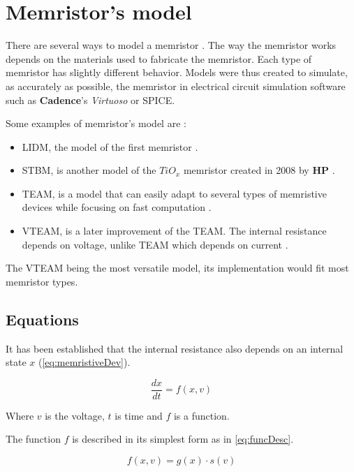 \section{Memristor's model}\label{sec:model}

There are several ways to model a memristor \cite{memristorFab,memTEAMmodel, memVTEAMmodel, memristorSpiceModels}. The way the memristor works depends on the materials used to fabricate the memristor. Each type of memristor has slightly different behavior. Models were thus created to simulate, as accurately as possible, the memristor in electrical circuit simulation software such as \textbf{Cadence}'s \textit{Virtuoso} or SPICE.

Some examples of memristor's model are :

\begin{itemize}
  \item \acf{LIDM}, the model of the first memristor \cite{memristorFab}.
  \item \acf{STBM}, is another model of the $TiO_x$ memristor created in 2008 by \textbf{HP} \cite{memristorFab, memristorSpiceModels}.
  \item \acf{TEAM}, is a model that can easily adapt to several types of memristive devices while focusing on fast computation \cite{memTEAMmodel}.
  \item \acf{VTEAM}, is a later improvement of the \ac{TEAM}. The internal resistance depends on voltage, unlike \ac{TEAM} which depends on current \cite{memVTEAMmodel}.
\end{itemize}

The \ac{VTEAM} being the most versatile model, its implementation would fit most memristor types.

\subsection{Equations}

It has been established that the internal resistance also depends on an internal state $x$ (\cref{eq:memristiveDev}).

\begin{equation}
  \frac{dx}{dt}=f(x,v)
\end{equation}

Where $v$ is the voltage, $t$ is time and $f$ is a function.

The function $f$ is described in its simplest form as in \cref{eq:funcDesc}.

\begin{equation}\label{eq:funcDesc}
  f(x,v)=g(x)\cdot s(v)
\end{equation}

